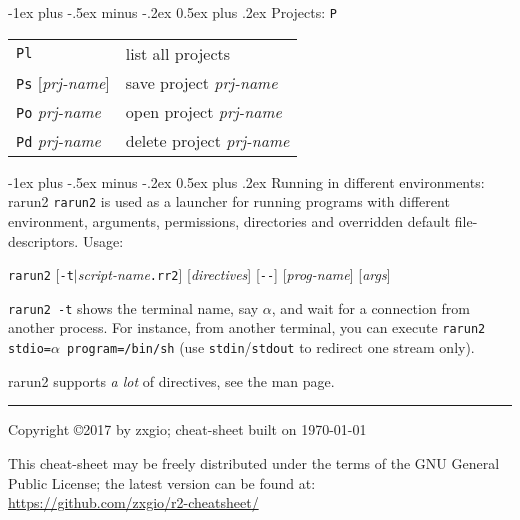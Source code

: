 \documentclass[a4paper,landscape]{article}
\makeatletter
\renewcommand{\section}{\@startsection{section}{1}{0mm}%
                                {-1ex plus -.5ex minus -.2ex}%
                                {0.5ex plus .2ex}%
                                {\normalfont\large\bfseries}}
\makeatother
\begin{document}
\begin{multicols*}{3}
\section{Projects: \texttt{P}}
\begin{tabular}{@{}ll@{}}
\texttt{Pl} & list all projects \\
\texttt{Ps} [\textit{prj-name}] & save project \textit{prj-name} \\
\texttt{Po} \textit{prj-name} & open project \textit{prj-name} \\
\texttt{Pd} \textit{prj-name} & delete project \textit{prj-name} \\
\end{tabular}

\section{Running in different environments: rarun2}
\texttt{rarun2} is used as a launcher for running programs with different environment,
arguments, permissions, directories and overridden default file-descriptors.
Usage:

\texttt{rarun2} [\texttt{-t}$|$\textit{script-name}\texttt{.rr2}] [\textit{directives}] [\texttt{-{}-}] [\textit{prog-name}] [\textit{args}]

\texttt{rarun2 -t} shows the terminal name, say $\alpha$, and wait for a connection from another process. For instance, from another terminal, you can execute \texttt{rarun2 stdio=$\alpha$ program=/bin/sh} (use \texttt{stdin}/\texttt{stdout} to redirect one stream only).

rarun2 supports \emph{a lot} of directives, see the man page.


\rule{1.0\linewidth}{0.25pt}
\scriptsize
Copyright \copyright 2017 by zxgio; cheat-sheet built on \today

This cheat-sheet may be freely distributed under the terms of the GNU
General Public License; the latest version can be found at: \\
\url{https://github.com/zxgio/r2-cheatsheet/}
\end{multicols*}
\end{document}
